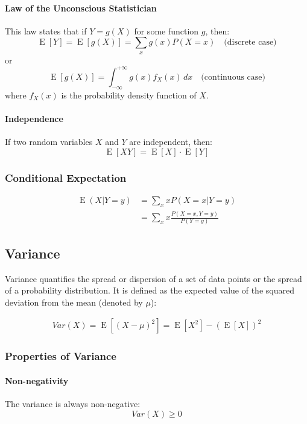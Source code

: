 \documentclass[8pt, a4paper, landscape, includeheadfoot]{extarticle}
\begin{document}
\begin{multicols*}{4}
	\paragraph{Law of the Unconscious Statistician}
	This law states that if \(Y = g(X)\) for some function \(g\), then:
	$$
		\operatorname{E}[Y] = \operatorname{E}[g(X)] = \sum_x g(x) P(X = x) \quad \text{(discrete case)}
	$$
	or
	$$
		\operatorname{E}[g(X)] = \int_{-\infty}^{+\infty} g(x) f_X(x) \, dx \quad \text{(continuous case)}
	$$
	where \(f_X(x)\) is the probability density function of \(X\).

	\paragraph{Independence}
	If two random variables \(X\) and \(Y\) are independent, then:
	$$
		\operatorname{E}[XY] = \operatorname{E}[X] \cdot \operatorname{E}[Y]
	$$

	\subsubsection{Conditional Expectation}{}

	\begin{align*}
		\operatorname{E}(X | Y = y) & =  \sum_x x P(X = x | Y = y)                \\
		                            & = \sum_x x \frac{P(X = x, Y = y)}{P(Y = y)}
	\end{align*}

	\subsection{Variance}

	Variance quantifies the spread or dispersion of a set of data points or the spread of a probability distribution. It is defined as the expected value of the squared deviation from the mean (denoted by \(\mu\)):

	\begin{align*}
		Var(X) = \operatorname{E}[\left(X - \mu\right)^2] = \operatorname{E}[X^2] - (\operatorname{E}[X])^2
	\end{align*}

	\subsubsection{Properties of Variance}

	\paragraph{Non-negativity}
	The variance is always non-negative:
	$$
		Var(X) \geq 0
	$$


\end{multicols*}
\end{document}
